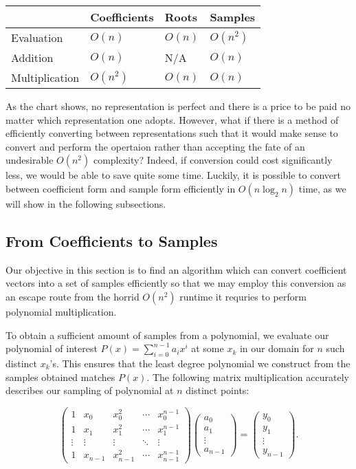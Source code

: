 \documentclass[../article.tex]{subfiles}
\begin{document}
\begin{tabular}{|p{2.8cm}||p{2cm}|p{2cm}|p{2cm}|}
\hline
&Coefficients&Roots&Samples\\
\hline\hline
Evaluation&$O(n)$&$O(n)$&$O(n^2)$\\
\hline
Addition&$O(n)$&N/A&$O(n)$\\
\hline
Multiplication&$O(n^2)$&$O(n)$&$O(n)$\\
\hline
\end{tabular}
\medskip

As the chart shows, no representation is perfect and there is a price to be paid no matter which representation one adopts. However, what if there is a method of efficiently converting between representations such that it would make sense to convert and perform the opertaion rather than accepting the fate of an undesirable $O(n^2)$ complexity? Indeed, if conversion could cost significantly less, we would be able to save quite some time. Luckily, it is possible to convert between  coefficient form and sample form efficiently in $O(n\log_2{n})$ time, as we will show in the following subsections.

\subsection{From Coefficients to Samples}
Our objective in this section is to find an algorithm which can convert coefficient vectors into a set of samples efficiently so that we may employ this conversion as an escape route from the horrid $O(n^2)$ runtime it requries to perform polynomial multiplication.

To obtain a sufficient amount of samples from a polynomial, we evaluate our polynomial of interest $P(x) = \sum_{i=0}^{n-1} a_ix^i$ at some $x_k$ in our domain for $n$ such distinct $x_k$'s. This ensures that the least degree polynomial we construct from the samples obtained matches $P(x)$. The following matrix multiplication accurately describes our sampling of polynomial at $n$ distinct points:

\begin{equation} \label{matrix sampling}
		\begin{pmatrix}
		1 & x_0 & x_0^2 & \cdots & x_0^{n-1}\\
		1 & x_1 & x_1^2& \cdots & x_1^{n-1}\\
		\vdots & \vdots & \vdots & \ddots & \vdots\\
		1 & x_{n-1}  & x_{n-1}^{2}& \cdots & x_{n-1}^{n-1}
		\end{pmatrix}
		\begin{pmatrix}
		a_0\\
		a_1\\
		\vdots\\
		a_{n-1}
		\end{pmatrix}
		=
		\begin{pmatrix}
		y_0\\
		y_1\\
		\vdots\\
		y_{n-1}
		\end{pmatrix}.
\end{equation}
\end{document}
